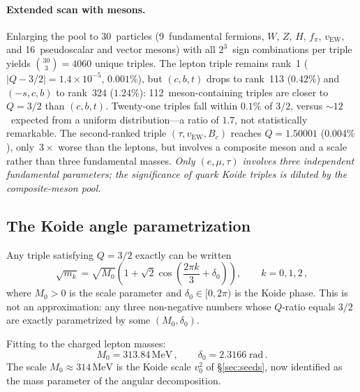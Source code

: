 \documentclass[12pt,a4paper]{article}
\newcommand{\MeV}{\,\text{MeV}}
\newcommand{\fpi}{f_\pi}
\begin{document}
\paragraph{Extended scan with mesons.}
Enlarging the pool to 30~particles (9~fundamental fermions, $W$, $Z$,
$H$, $\fpi$, $v_{\text{EW}}$, and 16~pseudoscalar and vector mesons)
with all $2^3$~sign combinations per triple yields $\binom{30}{3} = 4060$
unique triples.  The lepton triple remains rank~1
($|Q-3/2| = 1.4\times 10^{-5}$, $0.001\%$), but $(c,b,t)$ drops to
rank~113 ($0.42\%$) and $(-s,c,b)$ to rank~324 ($1.24\%$): 112~meson-containing
triples are closer to $Q = 3/2$ than $(c,b,t)$.  Twenty-one triples
fall within $0.1\%$ of $3/2$, versus $\sim 12$~expected from a uniform
distribution---a ratio of $1.7$, not statistically remarkable.  The
second-ranked triple $(\tau, v_{\text{EW}}, B_c)$ reaches $Q = 1.50001$
($0.004\%$), only~$3\times$ worse than the leptons, but involves a
composite meson and a scale rather than three fundamental masses.
\emph{Only $(e,\mu,\tau)$ involves three independent fundamental
parameters; the significance of quark Koide triples is diluted by the
composite-meson pool.}

\subsection{The Koide angle parametrization}
Any triple satisfying $Q = 3/2$ exactly can be written
\cite{Koide1983}
\begin{equation}
\label{eq:koide_angle}
\sqrt{m_k} = \sqrt{M_0}\left(1 + \sqrt{2}\cos\!\left(
\frac{2\pi k}{3} + \delta_0\right)\right), \qquad k = 0,1,2\,,
\end{equation}
where $M_0 > 0$ is the scale parameter and $\delta_0 \in [0, 2\pi)$
is the Koide phase. This is not an approximation: any three
non-negative numbers whose $Q$-ratio equals $3/2$ are exactly
parametrized by some $(M_0, \delta_0)$.

Fitting to the charged lepton masses:
\begin{equation}
M_0 = 313.84\MeV\,, \qquad \delta_0 = 2.3166\;\text{rad}\,.
\end{equation}
The scale $M_0 \approx 314\MeV$ is the Koide scale $v_0^2$ of
\S\ref{sec:seeds}, now identified as the mass parameter of the
angular decomposition.
\end{document}
